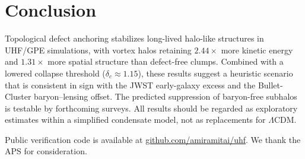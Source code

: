 \documentclass[reprint,amsmath,amssymb,aps,prl,superscriptaddress]{revtex4-2}
\begin{document}
\section{Conclusion}
\label{sec:conclusion}

Topological defect anchoring stabilizes long-lived halo-like structures in UHF/GPE simulations, with vortex halos retaining $2.44\times$ more kinetic energy and $1.31\times$ more spatial structure than defect-free clumps. Combined with a lowered collapse threshold ($\delta_c\approx1.15$), these results suggest a heuristic scenario that is consistent in sign with the JWST early-galaxy excess and the Bullet-Cluster baryon--lensing offset. The predicted suppression of baryon-free subhalos is testable by forthcoming surveys. All results should be regarded as exploratory estimates within a simplified condensate model, not as replacements for $\Lambda$CDM.

\begin{acknowledgments}
Public verification code is available at \href{https://github.com/amiramitai/uhf}{github.com/amiramitai/uhf}. We thank the APS for consideration.
\end{acknowledgments}


\end{document}

